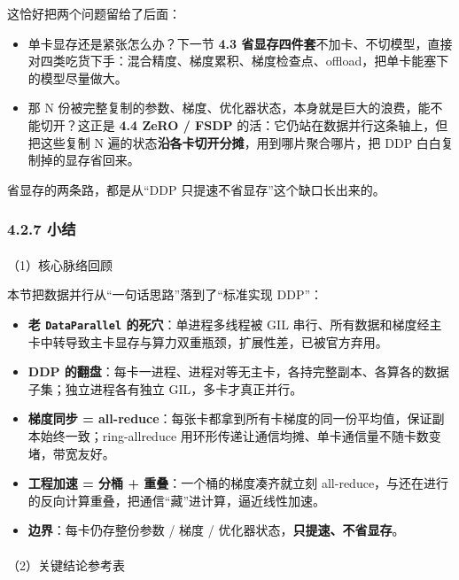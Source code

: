 \documentclass[
  chinese,
]{ctexart}
\makeatletter
\let\oldparagraph\paragraph
\renewcommand{\paragraph}{
    \@ifstar
      \xxxParagraphStar
      \xxxParagraphNoStar
  }
\newcommand{\xxxParagraphStar}[1]{\oldparagraph*{#1}\mbox{}}
\newcommand{\xxxParagraphNoStar}[1]{\oldparagraph{#1}\mbox{}}
\providecommand{\tightlist}{%
  \setlength{\itemsep}{0pt}\setlength{\parskip}{0pt}}
\makeatother
\begin{document}
这恰好把两个问题留给了后面：

\begin{itemize}
\tightlist
\item
  单卡显存还是紧张怎么办？下一节 \textbf{4.3
  省显存四件套}不加卡、不切模型，直接对四类吃货下手：混合精度、梯度累积、梯度检查点、offload，把单卡能塞下的模型尽量做大。
\item
  那 N
  份被完整复制的参数、梯度、优化器状态，本身就是巨大的浪费，能不能切开？这正是
  \textbf{4.4 ZeRO / FSDP} 的活：它仍站在数据并行这条轴上，但把这些复制
  N 遍的状态\textbf{沿各卡切开分摊}，用到哪片聚合哪片，把 DDP
  白白复制掉的显存省回来。
\end{itemize}

省显存的两条路，都是从``DDP 只提速不省显存''这个缺口长出来的。

\subsubsection{4.2.7 小结}\label{ux5c0fux7ed3-1}

\paragraph{（1）核心脉络回顾}\label{ux6838ux5fc3ux8109ux7edcux56deux987e-1}

本节把数据并行从``一句话思路''落到了``标准实现 DDP''：

\begin{itemize}
\tightlist
\item
  \textbf{老 \texttt{DataParallel} 的死穴}：单进程多线程被 GIL
  串行、所有数据和梯度经主卡中转导致主卡显存与算力双重瓶颈，扩展性差，已被官方弃用。
\item
  \textbf{DDP
  的翻盘}：每卡一进程、进程对等无主卡，各持完整副本、各算各的数据子集；独立进程各有独立
  GIL，多卡才真正并行。
\item
  \textbf{梯度同步 =
  all-reduce}：每张卡都拿到所有卡梯度的同一份平均值，保证副本始终一致；ring-allreduce
  用环形传递让通信均摊、单卡通信量不随卡数变堵，带宽友好。
\item
  \textbf{工程加速 = 分桶 + 重叠}：一个桶的梯度凑齐就立刻
  all-reduce，与还在进行的反向计算重叠，把通信``藏''进计算，逼近线性加速。
\item
  \textbf{边界}：每卡仍存整份参数 / 梯度 /
  优化器状态，\textbf{只提速、不省显存}。
\end{itemize}

\paragraph{（2）关键结论参考表}\label{ux5173ux952eux7ed3ux8bbaux53c2ux8003ux8868}
\end{document}
